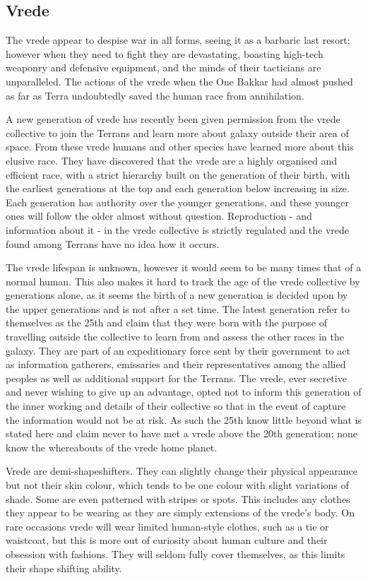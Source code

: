 \documentclass{scrbook}
\begin{document}
\subsection{Vrede}

The vrede appear to despise war in all forms, seeing it as a barbaric last resort; however when they need to fight they are devastating, boasting high-tech weaponry and defensive equipment, and the minds of their tacticians are unparalleled. The actions of the vrede when the One Bakkar had almost pushed as far as Terra undoubtedly saved the human race from annihilation.

A new generation of vrede has recently been given permission from the vrede collective to join the Terrans and learn more about galaxy outside their area of space. From these vrede humans and other species have learned more about this elusive race. They have discovered that the vrede are a highly organised and efficient race, with a strict hierarchy built on the generation of their birth, with the earliest generations at the top and each generation below increasing in size. Each generation has authority over the younger generations, and these younger ones will follow the older almost without question. Reproduction - and information about it - in the vrede collective is strictly regulated and the vrede found among Terrans have no idea how it occurs.

The vrede lifespan is unknown, however it would seem to be many times that of a normal human. This also makes it hard to track the age of the vrede collective by generations alone, as it seems the birth of a new generation is decided upon by the upper generations and is not after a set time. The latest generation refer to themselves as the 25th and claim that they were born with the purpose of travelling outside the collective to learn from and assess the other races in the galaxy. They are part of an expeditionary force sent by their government to act as information gatherers, emissaries and their representatives among the allied peoples as well as additional support for the Terrans. The vrede, ever secretive and never wishing to give up an advantage, opted not to inform this generation of the inner working and details of their collective so that in the event of capture the information would not be at risk. As such the 25th know little beyond what is stated here and claim never to have met a vrede above the 20th generation; none know the whereabouts of the vrede home planet.

Vrede are demi-shapeshifters. They can slightly change their physical appearance but not their skin colour, which tends to be one colour with slight variations of shade. Some are even patterned with stripes or spots. This includes any clothes they appear to be wearing as they are simply extensions of the vrede's body. On rare occasions vrede will wear limited human-style clothes, such as a tie or waistcoat, but this is more out of curiosity about human culture and their obsession with fashions. They will seldom fully cover themselves, as this limits their shape shifting ability.
\end{document}
